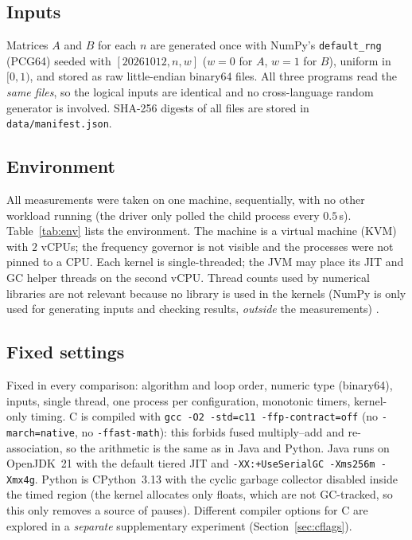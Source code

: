 \subsection{Inputs}
Matrices $A$ and $B$ for each $n$ are generated once with NumPy's \texttt{default\_rng} (PCG64) seeded with
$[20261012, n, w]$ ($w=0$ for $A$, $w=1$ for $B$), uniform in $[0,1)$, and stored as raw little-endian binary64
files. All three programs read the \emph{same files}, so the logical inputs are identical and no cross-language
random generator is involved. SHA-256 digests of all files are stored in \texttt{data/manifest.json}.

\subsection{Environment}
\label{sec:env}
All measurements were taken on one machine, sequentially, with no other workload running (the driver only polled
the child process every $0.5$\,s). Table~\ref{tab:env} lists the environment. The machine is a virtual machine
(KVM) with $2$ vCPUs; the frequency governor is not visible and the processes were not pinned to a CPU. Each
kernel is single-threaded; the JVM may place its JIT and GC helper threads on the second vCPU. Thread counts used
by numerical libraries are not relevant because no library is used in the kernels (NumPy is only used for
generating inputs and checking results, \emph{outside} the measurements) \cite{numpy}.

\begin{table}[H]
\centering\small

\caption{Hardware and software environment.}
\label{tab:env}
\end{table}

\subsection{Fixed settings}
Fixed in every comparison: algorithm and loop order, numeric type (binary64), inputs, single thread, one process
per configuration, monotonic timers, kernel-only timing. C is compiled with
\texttt{gcc -O2 -std=c11 -ffp-contract=off} (no \texttt{-march=native}, no \texttt{-ffast-math}): this forbids fused
multiply--add and re-association, so the arithmetic is the same as in Java and Python. Java runs on OpenJDK~21
with the default tiered JIT and \texttt{-XX:+UseSerialGC -Xms256m -Xmx4g}. Python is CPython~3.13 with the cyclic
garbage collector disabled inside the timed region (the kernel allocates only floats, which are not GC-tracked, so
this only removes a source of pauses). Different compiler options for C are explored in a \emph{separate}
supplementary experiment (Section~\ref{sec:cflags}).

